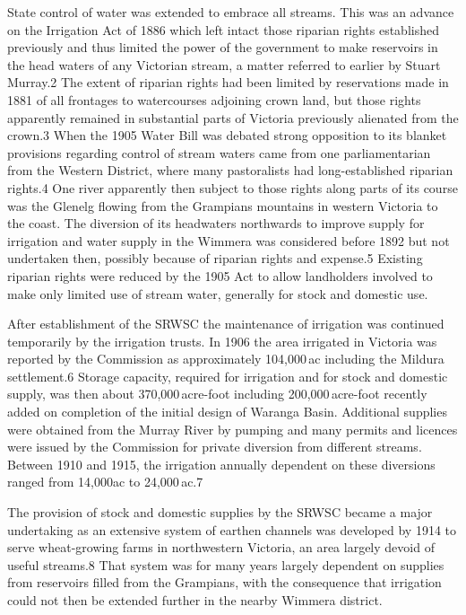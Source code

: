 State control of water was extended to embrace all streams.  This was
an advance on the Irrigation Act of 1886 which left intact those
riparian rights established previously and thus limited the power of
the government to make reservoirs in the head waters of any Victorian
stream, a matter referred to earlier by Stuart Murray.2 The extent of
riparian rights had been limited by reservations made in 1881 of all
frontages to watercourses adjoining crown land, but those rights
apparently remained in substantial parts of Victoria previously
alienated from the crown.3 When the 1905 Water Bill was debated strong
opposition to its blanket provisions regarding control of stream
waters came from one parliamentarian from the Western District, where
many pastoralists had long-established riparian rights.4 One river
apparently then subject to those rights along parts of its course was
the Glenelg flowing from the Grampians mountains in western Victoria
to the coast.  The diversion of its headwaters northwards to improve
supply for irrigation and water supply in the Wimmera was considered
before 1892 but not undertaken then, possibly because of riparian
rights and expense.5 Existing riparian rights were reduced by the 1905
Act to allow landholders involved to make only limited use of stream
water, generally for stock and domestic use.

After establishment of the SRWSC the maintenance of irrigation was
continued temporarily by the irrigation trusts. In 1906 the area
irrigated in Victoria was reported by the Commission as approximately
104,000\,ac including the Mildura settlement.6 Storage capacity,
required for irrigation and for stock and domestic supply, was then
about 370,000\,acre-foot including 200,000\,acre-foot recently added
on completion of the initial design of Waranga Basin.  Additional
supplies were obtained from the Murray River by pumping and many
permits and licences were issued by the Commission for private
diversion from different streams.  Between 1910 and 1915, the
irrigation annually dependent on these diversions ranged from 14,000ac
to 24,000\,ac.7

The provision of stock and domestic supplies by the SRWSC became a
major undertaking as an extensive system of earthen channels was
developed by 1914 to serve wheat-growing farms in northwestern
Victoria, an area largely devoid of useful streams.8 That system was
for many years largely dependent on supplies from reservoirs filled
from the Grampians, with the consequence that irrigation could not
then be extended further in the nearby Wimmera district.

